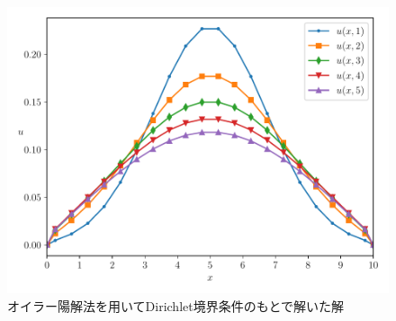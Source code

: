 \documentclass[a4j, titlepage]{jsarticle}
\numberwithin{equation}{section}
\begin{document}
            \begin{figure}[h]
                \centering
                \includegraphics[width=0.8\hsize]{kadai1/1.pdf}
                \caption{オイラー陽解法を用いてDirichlet境界条件のもとで解いた解}
                \label{fig:euler_dirichlet}
            \end{figure}
\end{document}
